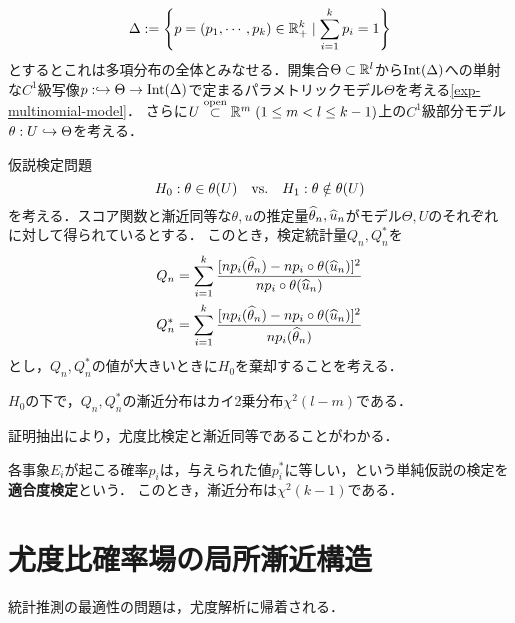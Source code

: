 \documentclass[uplatex,dvipdfmx]{jsreport}
\begin{document}
\begin{notation}[モデルの設定]
    \[\Delta:=\left\{p=(p_1,\cdots,p_k)\in\mathbb{R}_+^k\mid\sum^k_{i=1}p_i=1\right\}\]
    とするとこれは多項分布の全体とみなせる．開集合$\Theta\subset\mathbb{R}^l$から$\mathrm{Int}(\Delta)$への単射な$C^1$級写像$p:\hookrightarrow\Theta\to\mathrm{Int}(\Delta)$で定まるパラメトリックモデル$\Theta$を考える\ref{exp-multinomial-model}．
    さらに$U\overset{\mathrm{open}}{\subset}\mathbb{R}^m\;(1\le m<l\le k-1)$上の$C^1$級部分モデル$\theta:U\hookrightarrow\Theta$を考える．
\end{notation}

\begin{problem}
    仮説検定問題
    \[H_0:\theta\in\theta(U)\quad\mathrm{vs.}\quad H_1:\theta\notin\theta(U)\]
    を考える．スコア関数と漸近同等な$\theta,u$の推定量$\widehat{\theta}_n,\widehat{u}_n$がモデル$\Theta,U$のそれぞれに対して得られているとする．
    このとき，検定統計量$Q_n,Q_n^*$を
    \begin{align*}
        Q_n&=\sum^k_{i=1}\frac{[np_i(\widehat{\theta}_n)-np_i\circ\theta(\widehat{u}_n)]^2}{np_i\circ\theta(\widehat{u}_n)}\\
        Q_n^*&=\sum^k_{i=1}\frac{[np_i(\widehat{\theta}_n)-np_i\circ\theta(\widehat{u}_n)]^2}{np_i(\widehat{\theta}_n)}
    \end{align*}
    とし，$Q_n,Q_n^*$の値が大きいときに$H_0$を棄却することを考える．
\end{problem}

\begin{theorem}
    $H_0$の下で，$Q_n,Q_n^*$の漸近分布はカイ2乗分布$\chi^2(l-m)$である．
\end{theorem}
\begin{remarks}
    証明抽出により，尤度比検定と漸近同等であることがわかる．
\end{remarks}

\begin{example}
    各事象$E_i$が起こる確率$p_i$は，与えられた値$p^*_i$に等しい，という単純仮説の検定を\textbf{適合度検定}という．
    このとき，漸近分布は$\chi^2(k-1)$である．
\end{example}

\section{尤度比確率場の局所漸近構造}

\begin{tcolorbox}[colframe=ForestGreen, colback=ForestGreen!10!white,breakable,colbacktitle=ForestGreen!40!white,coltitle=black,fonttitle=\bfseries\sffamily,
title=]
    統計推測の最適性の問題は，尤度解析に帰着される．
\end{tcolorbox}
\end{document}
